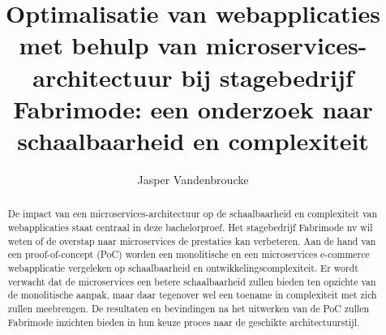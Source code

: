 \documentclass{hogent-article}
\title{Optimalisatie van webapplicaties met behulp van microservices-architectuur bij stagebedrijf Fabrimode: een onderzoek naar schaalbaarheid en complexiteit}
\author{Jasper Vandenbroucke}
\begin{document}
\begin{abstract}
  De impact van een microservices-architectuur op de schaalbaarheid en complexiteit van webapplicaties staat centraal in deze bachelorproef. Het stagebedrijf Fabrimode nv wil weten of de overstap naar microservices de prestaties kan verbeteren. Aan de hand van een proof-of-concept (PoC) worden een monolitische en een microservices e-commerce webapplicatie vergeleken op schaalbaarheid en ontwikkelingscomplexiteit. Er wordt verwacht dat de microservices een betere schaalbaarheid zullen bieden ten opzichte van de monolitische aanpak, maar daar tegenover wel een toename in complexiteit met zich zullen meebrengen. De resultaten en bevindingen na het uitwerken van de PoC zullen Fabrimode inzichten bieden in hun keuze proces naar de geschikte architectuurstijl.
\end{abstract}

\tableofcontents



\printbibliography[heading=bibintoc]
\end{document}
